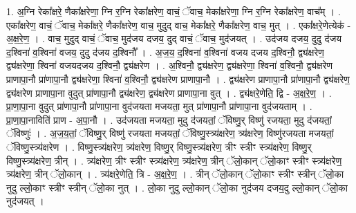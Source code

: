 \documentclass[17pt]{extarticle}
\begin{document}
1. अ॒ग्नि रेका᳚क्षरे॒ णैका᳚क्षरेणा॒ ग्नि र॒ग्नि रेका᳚क्षरेण॒ वाचं॒ ॅवाच॒ मेका᳚क्षरेणा॒ ग्नि र॒ग्नि रेका᳚क्षरेण॒ वाच᳚म् । . एका᳚क्षरेण॒ वाचं॒ ॅवाच॒ मेका᳚क्षरे॒ णैका᳚क्षरेण॒ वाच॒ मुदुद् वाच॒ मेका᳚क्षरे॒ णैका᳚क्षरेण॒ वाच॒ मुत् । . एका᳚क्षरे॒णेत्येक॑ - अ॒क्ष॒रे॒ण॒ । . वाच॒ मुदुद् वाचं॒ ॅवाच॒ मुद॑जय दजय॒ दुद् वाचं॒ ॅवाच॒ मुद॑जयत् । . उद॑जय दजय॒ दुदु द॑जय द॒श्विना॑ व॒श्विना॑ वजय॒ दुदु द॑जय द॒श्विनौ᳚ । . अ॒ज॒य॒ द॒श्विना॑ व॒श्विना॑ वजय दजय द॒श्विनौ॒ द्व्य॑क्षरेण॒ द्व्य॑क्षरेणा॒ श्विना॑ वजयदजय द॒श्विनौ॒ द्व्य॑क्षरेण । . अ॒श्विनौ॒ द्व्य॑क्षरेण॒ द्व्य॑क्षरेणा॒ श्विना॑ व॒श्विनौ॒ द्व्य॑क्षरेण प्राणापा॒नौ प्रा॑णापा॒नौ द्व्य॑क्षरेणा॒ 
श्विना॑ व॒श्विनौ॒ द्व्य॑क्षरेण प्राणापा॒नौ । . द्व्य॑क्षरेण प्राणापा॒नौ प्रा॑णापा॒नौ द्व्य॑क्षरेण॒ द्व्य॑क्षरेण प्राणापा॒ना वुदुत् प्रा॑णापा॒नौ द्व्य॑क्षरेण॒ द्व्य॑क्षरेण प्राणापा॒ना वुत् । . द्व्य॑क्षरे॒णेति॒ द्वि - अ॒क्ष॒रे॒ण॒ । . प्रा॒णा॒पा॒ना वुदुत् प्रा॑णापा॒नौ प्रा॑णापा॒ना वुद॑जयता मजयता॒ मुत् प्रा॑णापा॒नौ प्रा॑णापा॒ना वुद॑जयताम् । . प्रा॒णा॒पा॒नाविति॑ प्राण - अ॒पा॒नौ । . उद॑जयता मजयता॒ मुदु द॑जयतां॒ ॅविष्णु॒र् विष्णु॑ रजयता॒ मुदु द॑जयतां॒ ॅविष्णुः॑ । . अ॒ज॒य॒तां॒ ॅविष्णु॒र् विष्णु॑ रजयता मजयतां॒ ॅविष्णु॒स्त्र्य॑क्षरेण॒ त्र्य॑क्षरेण॒ विष्णु॑रजयता मजयतां॒ ॅविष्णु॒स्त्र्य॑क्षरेण । . विष्णु॒स्त्र्य॑क्षरेण॒ त्र्य॑क्षरेण॒ विष्णु॒र् विष्णु॒स्त्र्य॑क्षरेण॒ त्रीꣳ स्त्रीꣳ स्त्र्य॑क्षरेण॒ विष्णु॒र् विष्णु॒स्त्र्य॑क्षरेण॒ त्रीन् । . त्र्य॑क्षरेण॒ त्रीꣳ स्त्रीꣳ स्त्र्य॑क्षरेण॒ त्र्य॑क्षरेण॒ त्रीन् ॅलो॒कान् ॅलो॒काꣳ स्त्रीꣳ स्त्र्य॑क्षरेण॒ त्र्य॑क्षरेण॒ त्रीन् ॅलो॒कान् । . त्र्य॑क्षरे॒णेति॒ त्रि - अ॒क्ष॒रे॒ण॒ । . त्रीन् ॅलो॒कान् ॅलो॒काꣳ स्त्रीꣳ स्त्रीन् ॅलो॒का नुदु ल्लो॒काꣳ स्त्रीꣳ स्त्रीन् ॅलो॒का नुत् । . लो॒का नुदु ल्लो॒कान् ॅलो॒का नुद॑जय दजय॒दु ल्लो॒कान् ॅलो॒का नुद॑जयत् । \newline
\end{document}
